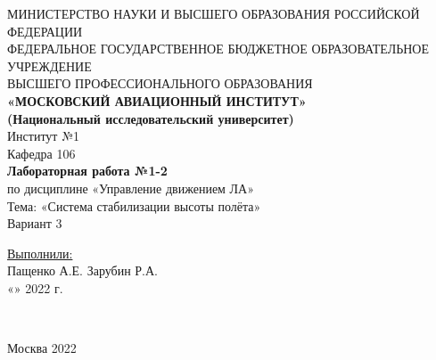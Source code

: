 
 
\begin{center}
    \hfill \break
    \large{МИНИСТЕРСТВО НАУКИ И ВЫСШЕГО ОБРАЗОВАНИЯ РОССИЙСКОЙ ФЕДЕРАЦИИ }\\
    \footnotesize{ФЕДЕРАЛЬНОЕ ГОСУДАРСТВЕННОЕ БЮДЖЕТНОЕ ОБРАЗОВАТЕЛЬНОЕ УЧРЕЖДЕНИЕ}\\ 
    \footnotesize{ВЫСШЕГО ПРОФЕССИОНАЛЬНОГО ОБРАЗОВАНИЯ}\\
    \small{\textbf{«МОСКОВСКИЙ АВИАЦИОННЫЙ ИНСТИТУТ»\\(Национальный исследовательский университет)}}\\ \hline
    \hfill \break
    \normalsize{Институт №1}\\
     \hfill \break
    \normalsize{Кафедра 106}\\
    \hfill\break
    \hfill \break
    \hfill \break
    \hfill \break
    \large{\textbf{Лабораторная работа №1-2} \\ по дисциплине «Управление движением ЛА» }\\
    \hfill \break
    \hfill \break
    \hfill \break
    \normalsize{Тема: «Система стабилизации высоты полёта» \\ Вариант 3}\\
\end{center}
\hfill \break
\hfill \break
\hfill \break
\hfill \break
\hfill \break
\hfill \break
\hfill \break
\normalsize{ 
\begin{flushleft}
    \underline{Выполнили:} \\ \hfill \break 
    Пащенко А.Е. Зарубин Р.А.\\
    \hfill \break
    «\underline{\hspace{1cm}}» \underline{\hspace{3cm}} 2022 г. \\ \hfill \break
\end{flushleft}
}\\
\hfill \break
\hfill \break
\hfill \break
\hfill \break
\hfill \break
\hfill \break
\begin{center} Москва 2022 \end{center}
\thispagestyle{empty} %
 
 
\newpage

